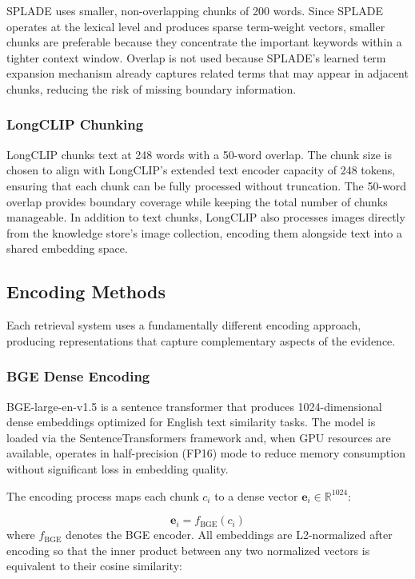 SPLADE uses smaller, non-overlapping chunks of 200 words. Since SPLADE operates at the lexical level and produces sparse term-weight vectors, smaller chunks are preferable because they concentrate the important keywords within a tighter context window. Overlap is not used because SPLADE's learned term expansion mechanism already captures related terms that may appear in adjacent chunks, reducing the risk of missing boundary information.

\subsubsection{LongCLIP Chunking}

LongCLIP chunks text at 248 words with a 50-word overlap. The chunk size is chosen to align with LongCLIP's extended text encoder capacity of 248 tokens, ensuring that each chunk can be fully processed without truncation. The 50-word overlap provides boundary coverage while keeping the total number of chunks manageable. In addition to text chunks, LongCLIP also processes images directly from the knowledge store's image collection, encoding them alongside text into a shared embedding space.

\subsection{Encoding Methods}

Each retrieval system uses a fundamentally different encoding approach, producing representations that capture complementary aspects of the evidence.

\subsubsection{BGE Dense Encoding}

BGE-large-en-v1.5 is a sentence transformer that produces 1024-dimensional dense embeddings optimized for English text similarity tasks. The model is loaded via the SentenceTransformers framework and, when GPU resources are available, operates in half-precision (FP16) mode to reduce memory consumption without significant loss in embedding quality.

The encoding process maps each chunk $c_i$ to a dense vector $\mathbf{e}_i \in \mathbb{R}^{1024}$:

\begin{equation}
    \mathbf{e}_i = f_{\text{BGE}}(c_i)
\end{equation}
where $f_{\text{BGE}}$ denotes the BGE encoder. All embeddings are L2-normalized after encoding so that the inner product between any two normalized vectors is equivalent to their cosine similarity:

